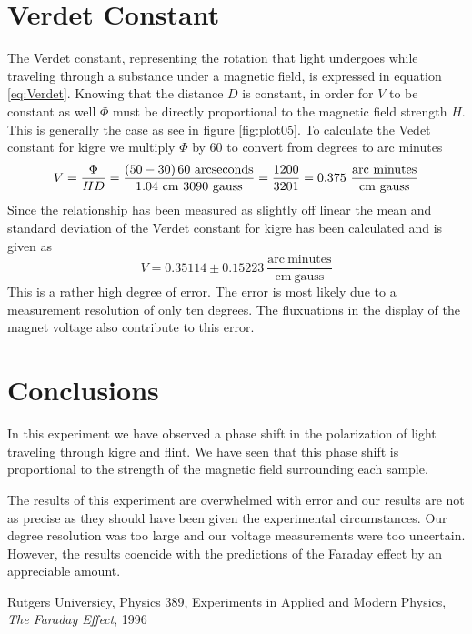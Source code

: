 \documentclass[10pt,onecolumn]{article} %
\begin{document}
\section{Verdet Constant}
The Verdet constant, representing the rotation that light undergoes while traveling through a substance under a magnetic field, is expressed in equation \ref{eq:Verdet}. Knowing that the distance $D$ is constant, in order for $V$ to be constant as well $\Phi$ must be directly proportional to the magnetic field strength $H$. This is generally the case as see in figure \ref{fig:plot05}. To calculate the Vedet constant for kigre we multiply $\Phi$ by 60 to convert from degrees to arc minutes
\begin{displaymath}
V = \frac{\Phi}{H D} = \frac{\left(50 -30\right) 60\ \mathrm{arc seconds}}{1.04\ \mathrm{cm}\ 3090\ \mathrm{gauss}}\\
= \frac{1200}{3201} = 0.375\ \frac{\mathrm{arc\ minutes}}{\mathrm{cm}\ \mathrm{gauss}}
\end{displaymath}
Since the relationship has been measured as slightly off linear the mean and standard deviation of the Verdet constant for kigre has been calculated and is given as
\begin{displaymath}
V = 0.35114 \pm 0.15223\ \frac{\mathrm{arc\ minutes}}{\mathrm{cm}\ \mathrm{gauss}}
\end{displaymath}
This is a rather high degree of error. The error is most likely due to a measurement resolution of only ten degrees. The fluxuations in the display of the magnet voltage also contribute to this error.

\section{Conclusions}
In this experiment we have observed a phase shift in the polarization of light traveling through kigre and flint. We have seen that this phase shift is proportional to the strength of the magnetic field surrounding each sample.

The results of this experiment are overwhelmed with error and our results are not as precise as they should have been given the experimental circumstances. Our degree resolution was too large and our voltage measurements were too uncertain. However, the results coencide with the predictions of the Faraday effect by an appreciable amount.

\begin{thebibliography}{9}
 Rutgers Universiey, Physics 389, Experiments in Applied and Modern Physics, {\em The Faraday Effect}, 1996
\end{thebibliography}
\end{document}
